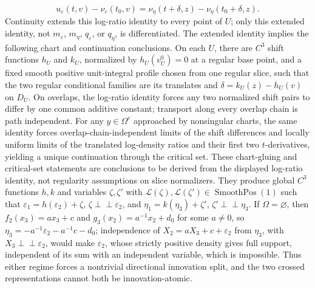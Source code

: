 \[u_{\varepsilon}(t,v)-\nu_{\varepsilon}(t_0,v)=\nu_{\eta}(t+\delta,z)-\nu_{\eta}(t_0+\delta,z).\] Continuity extends this log-ratio identity to every point of \(U\); only this extended identity, not \(m_{\varepsilon}\), \(m_{\eta}\), \(q_{\varepsilon}\), or \(q_{\eta}\), is differentiated. The extended identity implies the following chart and continuation conclusions. On each \(U\), there are \(C^3\) shift functions \(h_U\) and \(k_U\), normalized by \(h_U(v_U^0)=0\) at a regular base point, and a fixed smooth positive unit-integral profile chosen from one regular slice, such that the two regular conditional families are its translates and \(\delta=k_U(z)-h_U(v)\) on \(D_U\). On overlaps, the log-ratio identity forces any two normalized shift pairs to differ by one common additive constant; transport along every overlap chain is path independent. For any \(y\in\Omega^c\) approached by nonsingular charts, the same identity forces overlap-chain-independent limits of the shift differences and locally uniform limits of the translated log-density ratios and their first two \(t\)-derivatives, yielding a unique continuation through the critical set. These chart-gluing and critical-set statements are conclusions to be derived from the displayed log-ratio identity, not regularity assumptions on slice normalizers. They produce global \(C^3\) functions \(h,k\) and variables \(\zeta,\zeta'\) with \(\mathcal L(\zeta),\mathcal L(\zeta')\in\operatorname{SmoothPos}(1)\) such that \(\varepsilon_1=h(\varepsilon_2)+\zeta\), \(\zeta\perp\!\!\!\perp\varepsilon_2\), and \(\eta_1=k(\eta_3)+\zeta'\), \(\zeta'\perp\!\!\!\perp\eta_3\). If \(\Omega=\varnothing\), then \(f_2(x_3)=ax_3+c\) and \(g_3(x_2)=a^{-1}x_2+d_0\) for some \(a\neq0\), so \(\eta_3=-a^{-1}\varepsilon_2-a^{-1}c-d_0\); independence of \(X_2=aX_3+c+\varepsilon_2\) from \(\eta_3\), with \(X_3\perp\!\!\!\perp\varepsilon_2\), would make \(\varepsilon_2\), whose strictly positive density gives full support, independent of its sum with an independent variable, which is impossible. Thus either regime forces a nontrivial directional innovation split, and the two crossed representations cannot both be innovation-atomic.